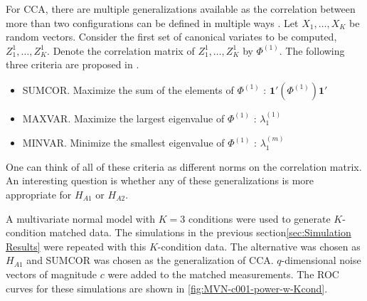 \documentclass[11pt]{article} %
\begin{document}
For CCA, there are multiple generalizations available as the correlation between more than two configurations can be defined in multiple ways \cite{generalCCA}. Let $X_1,\ldots,X_K$ be random vectors. Consider the first set of canonical variates to be computed, $Z_1^{1},\ldots,Z_K^{1}$. Denote  the correlation matrix of  $Z_1^{1},\ldots,Z_K^{1}$ by $\Phi^{(1)}$.   The following three criteria  are proposed in \cite{generalCCA}.
\begin{itemize}
\item SUMCOR. Maximize the sum of the elements of $\Phi^{(1)}$ : $\mathbf{1'}(\Phi^{(1)})\mathbf{1'}$
\item MAXVAR. Maximize the largest eigenvalue of $\Phi^{(1)}$ : $\lambda^{(1)}_1$ 
\item  MINVAR. Minimize  the smallest eigenvalue of $\Phi^{(1)}$ : $\lambda^{(m)}_1$ 
\end{itemize}
One can think of all of these criteria as different norms on the correlation matrix.
An interesting question is whether any of these generalizations is more appropriate for $H_{A1}$ or $H_{A2}$.

A multivariate normal model with $K=3$ conditions were used to generate $K$-condition matched data. 
The simulations in the previous section\ref{sec:Simulation Results} were repeated with this $K$-condition data. 
The alternative was chosen as $ H_{A1}$ and SUMCOR was chosen as the generalization of CCA.
 $q$-dimensional noise vectors of magnitude $c$ were added to the matched measurements. 
 The ROC curves for these simulations are shown in \ref{fig:MVN-c001-power-w-Kcond}.


 
\end{document}
